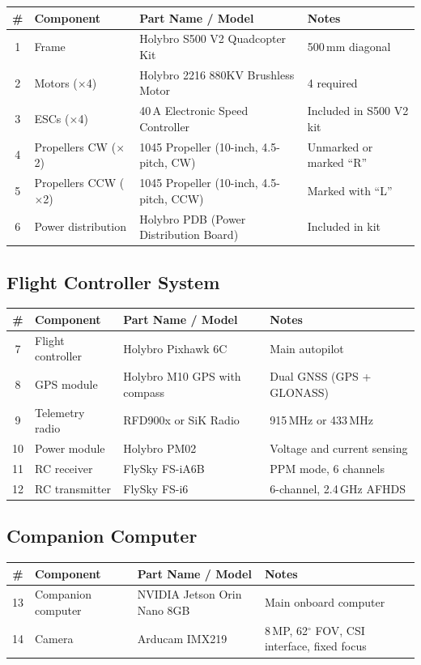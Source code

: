 \documentclass{article}
\begin{document}
\begin{tabular}{clll}
\toprule
\textbf{\#} & \textbf{Component} & \textbf{Part Name / Model} & \textbf{Notes} \\
\midrule
1 & Frame & Holybro S500 V2 Quadcopter Kit~\cite{holybro_s500} & 500\,mm diagonal \\
2 & Motors ($\times$4) & Holybro 2216 880KV Brushless Motor & 4 required \\
3 & ESCs ($\times$4) & 40\,A Electronic Speed Controller & Included in S500 V2 kit \\
4 & Propellers CW ($\times$2) & 1045 Propeller (10-inch, 4.5-pitch, CW) & Unmarked or marked ``R'' \\
5 & Propellers CCW ($\times$2) & 1045 Propeller (10-inch, 4.5-pitch, CCW) & Marked with ``L'' \\
6 & Power distribution & Holybro PDB (Power Distribution Board) & Included in kit \\
\bottomrule
\end{tabular}

\subsection{Flight Controller System}

\begin{tabular}{clll}
\toprule
\textbf{\#} & \textbf{Component} & \textbf{Part Name / Model} & \textbf{Notes} \\
\midrule
7  & Flight controller & Holybro Pixhawk 6C & Main autopilot \\
8  & GPS module & Holybro M10 GPS with compass & Dual GNSS (GPS + GLONASS) \\
9  & Telemetry radio & RFD900x or SiK Radio & 915\,MHz or 433\,MHz \\
10 & Power module & Holybro PM02 & Voltage and current sensing \\
11 & RC receiver & FlySky FS-iA6B & PPM mode, 6 channels \\
12 & RC transmitter & FlySky FS-i6 & 6-channel, 2.4\,GHz AFHDS \\
\bottomrule
\end{tabular}

\subsection{Companion Computer}

\begin{tabular}{clll}
\toprule
\textbf{\#} & \textbf{Component} & \textbf{Part Name / Model} & \textbf{Notes} \\
\midrule
13 & Companion computer & NVIDIA Jetson Orin Nano 8GB & Main onboard computer \\
14 & Camera & Arducam IMX219 & 8\,MP, 62$^\circ$ FOV, CSI interface, fixed focus \\
\bottomrule
\end{tabular}
\end{document}
